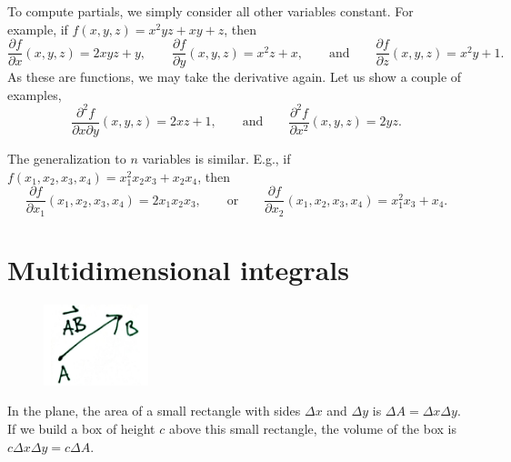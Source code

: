 \documentclass[12pt]{article}
\begin{document}
To compute partials, we simply consider all other variables constant.
For example, if $f(x,y,z) = x^2yz + xy + z$, then
\[
\frac{\partial f}{\partial x}(x,y,z) = 2xyz + y,
\qquad
\frac{\partial f}{\partial y}(x,y,z) = x^2z + x,
\qquad \text{and} \qquad
\frac{\partial f}{\partial z}(x,y,z) = x^2y + 1 .
\]
As these are functions, we may take the derivative again.  Let us show a couple of examples,
\[
\frac{\partial^2 f}{\partial x \partial y}(x,y,z) = 2xz + 1,
\qquad \text{and} \qquad
\frac{\partial^2 f}{\partial x^2}(x,y,z) = 2yz .
\]

The generalization to $n$ variables is similar.  E.g.,
if $f(x_1,x_2,x_3,x_4) = x_1^2x_2x_3 + x_2 x_4$, then
\[
\frac{\partial f}{\partial x_1}(x_1,x_2,x_3,x_4) = 2x_1 x_2 x_3,
\qquad \text{or} \qquad
\frac{\partial f}{\partial x_2}(x_1,x_2,x_3,x_4) = x_1^2 x_3 + x_4 .
\]

\section{Multidimensional integrals}

\begin{figure}
\vspace*{-0.4in}
\includegraphics[width=1.2in,page=4]{figures1}
\end{figure}
In the plane, the area of a small rectangle with sides $\Delta x$ and $\Delta y$
is $\Delta A = \Delta x \Delta y$.
If we build a box of height $c$ above
this small rectangle, the volume of the box is $c \Delta x \Delta y = c \Delta A$.
\end{document}
